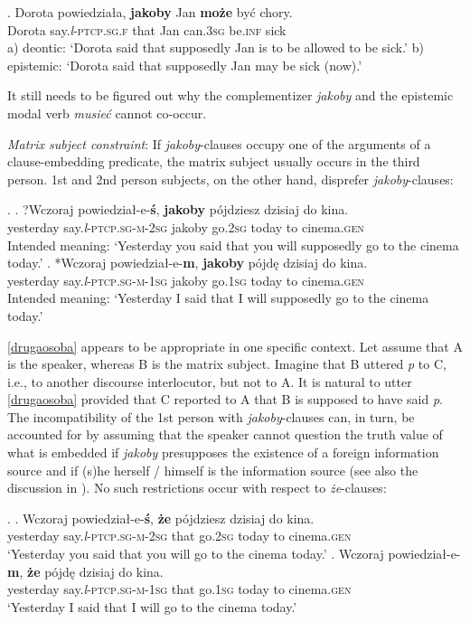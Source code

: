 \documentclass[output=paper
,modfonts
,nonflat]{langsci/langscibook}
\newcommand{\glossformat}[1]{\textsc{#1}}
\newcommand{\firstperson}{\glossformat{1}\xspace}
\newcommand{\secondperson}{\glossformat{2}\xspace}
\newcommand{\thirdperson}{\glossformat{3}\xspace}
\newcommand{\fem}{\glossformat{f}\xspace}
\newcommand{\gen}{\glossformat{gen}\xspace}
\newcommand{\infv}{\glossformat{inf}\xspace}
\newcommand{\lptcp}{\emph{l}\glossformat{-ptcp}\xspace}
\newcommand{\masc}{\glossformat{m}\xspace}
\newcommand{\sg}{\glossformat{sg}\xspace}
\begin{document}
\exg.		Dorota powiedziała, \textbf{jakoby} Jan \textbf{może} być chory. \\
		Dorota say.{\lptcp}.{\sg}.{\fem} that Jan can.{\thirdperson}{\sg} be.{\infv} sick \\
		a) deontic: `Dorota said that supposedly Jan is to be allowed to be sick.' \newline
		b) epistemic: `Dorota said that supposedly Jan may be sick (now).'

It still needs to be figured out why the complementizer \emph{jakoby} and the epistemic modal verb \emph{musieć} cannot co-occur.

\emph{Matrix subject constraint}: If \emph{jakoby}-clauses occupy one of the arguments of a clause-embedding predicate, the matrix subject usually occurs in the third person. 1st and 2nd person subjects, on the other hand, disprefer \emph{jakoby}-clauses:

  \ex.		\ag.	?Wczoraj powiedział-e-\textbf{ś}, \textbf{jakoby} pójdziesz dzisiaj do kina. \label{drugaosoba} \\
  			yesterday say.{\lptcp}.{\sg}-{\masc}-{\secondperson}{\sg} jakoby go.{\secondperson}{\sg} today to cinema.{\gen} \\
			Intended meaning: `Yesterday you said that  you will supposedly go to the cinema today.'
		\bg.	*Wczoraj powiedział-e-\textbf{m}, \textbf{jakoby} pójdę dzisiaj do kina. \label{pierwszy} \\
  			yesterday say.{\lptcp}.{\sg}-{\masc}-{\firstperson}{\sg} jakoby go.{\firstperson}{\sg} today to cinema.{\gen} \\
			Intended meaning: `Yesterday I said that I will supposedly go to the cinema today.'

\ref {drugaosoba} appears to be appropriate in one specific context. Let assume that A is the speaker, whereas B is the matrix subject. Imagine that B uttered \emph{p} to C, i.e., to another discourse interlocutor, but not to A. It is natural to utter \ref {drugaosoba} provided that C reported to A that B is supposed to have said \emph{p}. The incompatibility of the 1st person with \emph{jakoby}-clauses can, in turn, be accounted for by assuming that the speaker cannot question the truth value of what is embedded if \emph{jakoby} presupposes the existence of a foreign information source and if (s)he herself / himself is the information source (see also the discussion in \cite{Curnow2002}). No such restrictions occur with respect to \emph{że}-clauses:

 \ex.		\ag.	Wczoraj powiedział-e-\textbf{ś}, \textbf{że} pójdziesz dzisiaj do kina. \\
  			yesterday say.{\lptcp}.{\sg}-{\masc}-{\secondperson}{\sg} that go.{\secondperson}{\sg} today to cinema.{\gen} \\
			`Yesterday you said that you will go to the cinema today.'
		\bg.	Wczoraj powiedział-e-\textbf{m}, \textbf{że} pójdę dzisiaj do kina. \\
  			yesterday say.{\lptcp}.{\sg}-{\masc}-{\firstperson}{\sg} that go.{\firstperson}{\sg} today to cinema.{\gen} \\
			`Yesterday I said that I will go to the cinema today.'      
\end{document}
